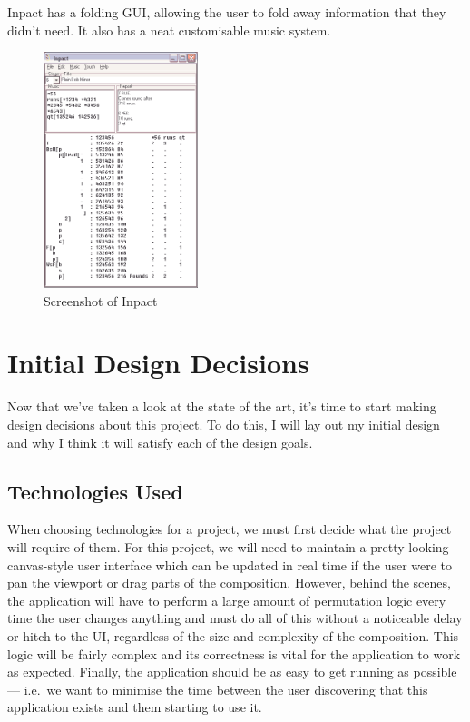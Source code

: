 \documentclass[12pt]{article}
\begin{document}
Inpact has a folding GUI, allowing the user to fold away information that they didn't need.  It also
has a neat customisable music system.

\begin{figure}
    \centering
    \includegraphics[width=0.4\textwidth]{inpact}
    \caption{Screenshot of Inpact}
\end{figure}



\pagebreak

\section{Initial Design Decisions}

Now that we've taken a look at the state of the art, it's time to start making design decisions
about this project.  To do this, I will lay out my initial design and why I think it will satisfy
each of the design goals.

\subsection{Technologies Used}

When choosing technologies for a project, we must first decide what the project will require of
them.  For this project, we will need to maintain a pretty-looking canvas-style user interface which
can be updated in real time if the user were to pan the viewport or drag parts of the composition.
However, behind the scenes, the application will have to perform a large amount of permutation logic
every time the user changes anything and must do all of this without a noticeable delay or hitch to
the UI, regardless of the size and complexity of the composition.  This logic will be fairly complex
and its correctness is vital for the application to work as expected.  Finally, the application
should be as easy to get running as possible --- i.e.\ we want to minimise the time between the user
discovering that this application exists and them starting to use it.
\end{document}

